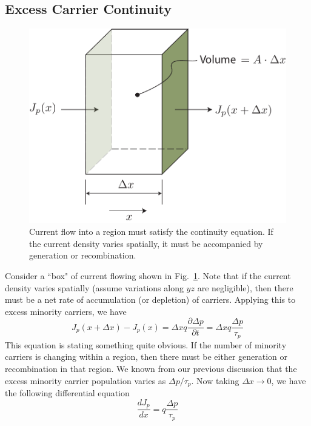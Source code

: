 \subsection{Excess Carrier Continuity}
\begin{figure}[tb]
\centering
\includegraphics[width=.65\columnwidth]{Jbox}
\caption{Current flow into a region must satisfy the continuity equation.  If the current density varies spatially, it must be accompanied by generation or recombination.}
\label{fig:Jbox}
\end{figure}
Consider a ``box" of current flowing shown in Fig.~\ref{fig:Jbox}.  Note that if the current density varies spatially (assume variations along $yz$ are negligible), then there must be a net rate of accumulation (or depletion) of carriers.  Applying this to excess minority carriers, we have
    \begin{equation}
        J_p(x + \Delta x) - J_p(x) =  \Delta x q \frac{\partial \Delta p}{\partial t} =  \Delta x q \frac{\Delta p}{\tau_p}
    \end{equation}
This equation is stating something quite obvious.  If the number of minority carriers is changing within a region, then there must be either generation or recombination in that region.  We known from our previous discussion that the excess minority carrier population varies as $\Delta p/\tau_p$.
Now taking $\Delta x \rightarrow 0$, we have the following differential equation
    \begin{equation}
        \frac{dJ_p}{dx}  = q \frac{\Delta p}{\tau_p}
    \end{equation}
